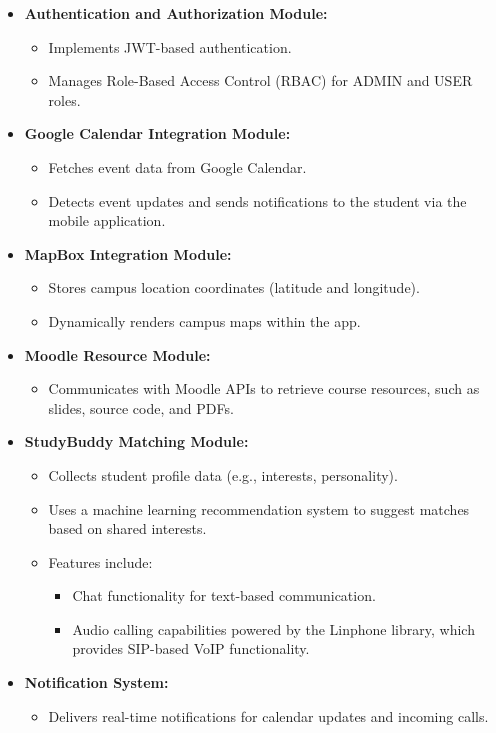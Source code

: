 \documentclass[12pt]{article}
\begin{document}
\begin{itemize}  
    \item \textbf{Authentication and Authorization Module:}  
    \begin{itemize}  
        \item Implements JWT-based authentication.  
        \item Manages Role-Based Access Control (RBAC) for ADMIN and USER roles.  
    \end{itemize}  

    \item \textbf{Google Calendar Integration Module:}  
    \begin{itemize}  
        \item Fetches event data from Google Calendar.  
        \item Detects event updates and sends notifications to the student via the mobile application.  
    \end{itemize}  

    \item \textbf{MapBox Integration Module:}  
    \begin{itemize}  
        \item Stores campus location coordinates (latitude and longitude).  
        \item Dynamically renders campus maps within the app.  
    \end{itemize}  

    \pagebreak
    \item \textbf{Moodle Resource Module:}  
    \begin{itemize}  
        \item Communicates with Moodle APIs to retrieve course resources, such as slides, source code, and PDFs.  
    \end{itemize}  

    \item \textbf{StudyBuddy Matching Module:}  
    \begin{itemize}  
        \item Collects student profile data (e.g., interests, personality).  
        \item Uses a machine learning recommendation system to suggest matches based on shared interests.  
        \item Features include:  
        \begin{itemize}  
            \item Chat functionality for text-based communication.  
            \item Audio calling capabilities powered by the Linphone library, which provides SIP-based VoIP functionality.  
        \end{itemize}  
    \end{itemize}  

    \item \textbf{Notification System:}  
    \begin{itemize}  
        \item Delivers real-time notifications for calendar updates and incoming calls.  
    \end{itemize}  
\end{itemize}
\end{document}
